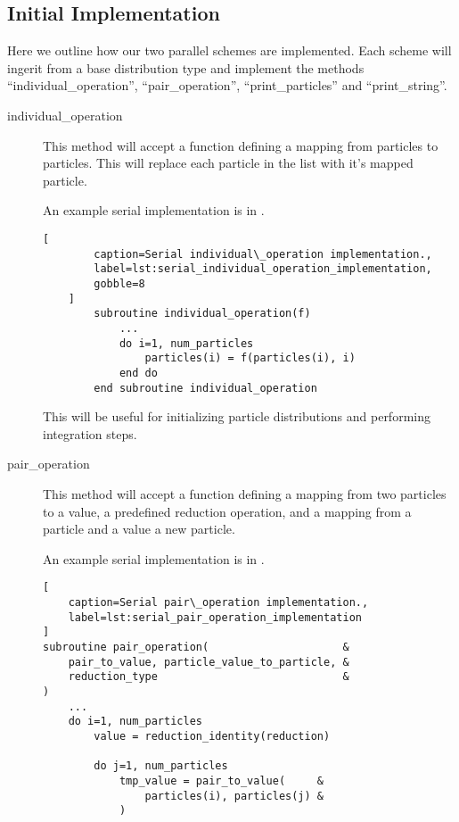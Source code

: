 \subsection{Initial Implementation}

Here we outline how our two parallel schemes are implemented.
%
Each scheme will ingerit from a base distribution type and
implement the methods
``individual\_operation'',
``pair\_operation'',
``print\_particles'' and
``print\_string''.
%
\begin{description}
\item[individual\_operation]
    This method will accept a function defining a mapping from
    particles to particles.
    This will replace each particle in the list with it's mapped
    particle.

    An example serial implementation is in
    .

    \begin{lstlisting}[
        caption=Serial individual\_operation implementation.,
        label=lst:serial_individual_operation_implementation,
        gobble=8
    ]
        subroutine individual_operation(f)
            ...
            do i=1, num_particles
                particles(i) = f(particles(i), i)
            end do
        end subroutine individual_operation
    \end{lstlisting}
    
    This will be useful for initializing particle distributions
    and performing integration steps.

\item[pair\_operation]
    This method will accept a function defining a mapping from two
    particles to a value, a predefined reduction operation, and
    a mapping from a particle and a value a new particle.

    An example serial implementation is in
    .

\begin{lstlisting}[
    caption=Serial pair\_operation implementation.,
    label=lst:serial_pair_operation_implementation
]
subroutine pair_operation(                     &
    pair_to_value, particle_value_to_particle, &
    reduction_type                             &
)
    ...
    do i=1, num_particles
        value = reduction_identity(reduction)

        do j=1, num_particles
            tmp_value = pair_to_value(     &
                particles(i), particles(j) &
            )


\end{lstlisting}
\end{description}
